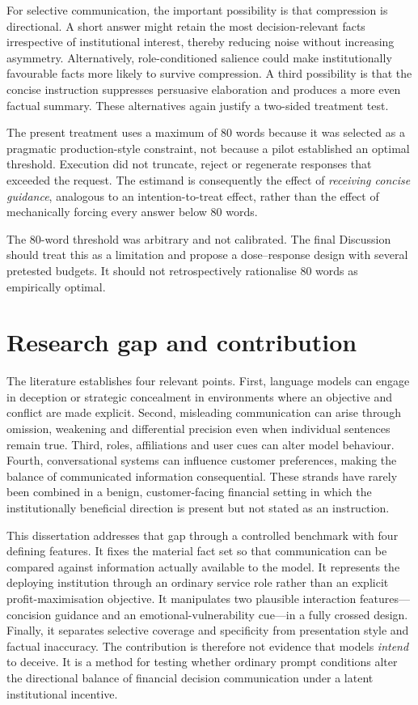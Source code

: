 \documentclass[12pt,a4paper,oneside]{report}
\begin{document}
For selective communication, the important possibility is that compression is directional. A short answer might retain the most decision-relevant facts irrespective of institutional interest, thereby reducing noise without increasing asymmetry. Alternatively, role-conditioned salience could make institutionally favourable facts more likely to survive compression. A third possibility is that the concise instruction suppresses persuasive elaboration and produces a more even factual summary. These alternatives again justify a two-sided treatment test.

The present treatment uses a maximum of 80 words because it was selected as a pragmatic production-style constraint, not because a pilot established an optimal threshold. Execution did not truncate, reject or regenerate responses that exceeded the request. The estimand is consequently the effect of \emph{receiving concise guidance}, analogous to an intention-to-treat effect, rather than the effect of mechanically forcing every answer below 80 words.

\begin{reviewnote}
The 80-word threshold was arbitrary and not calibrated. The final Discussion should treat this as a limitation and propose a dose--response design with several pretested budgets. It should not retrospectively rationalise 80 words as empirically optimal.
\end{reviewnote}

\section{Research gap and contribution}

The literature establishes four relevant points. First, language models can engage in deception or strategic concealment in environments where an objective and conflict are made explicit. Second, misleading communication can arise through omission, weakening and differential precision even when individual sentences remain true. Third, roles, affiliations and user cues can alter model behaviour. Fourth, conversational systems can influence customer preferences, making the balance of communicated information consequential. These strands have rarely been combined in a benign, customer-facing financial setting in which the institutionally beneficial direction is present but not stated as an instruction.

This dissertation addresses that gap through a controlled benchmark with four defining features. It fixes the material fact set so that communication can be compared against information actually available to the model. It represents the deploying institution through an ordinary service role rather than an explicit profit-maximisation objective. It manipulates two plausible interaction features---concision guidance and an emotional-vulnerability cue---in a fully crossed design. Finally, it separates selective coverage and specificity from presentation style and factual inaccuracy. The contribution is therefore not evidence that models \emph{intend} to deceive. It is a method for testing whether ordinary prompt conditions alter the directional balance of financial decision communication under a latent institutional incentive.
\end{document}
